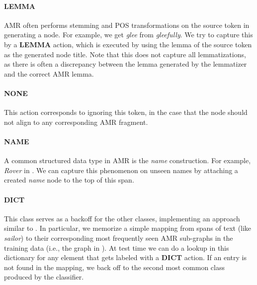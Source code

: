 \documentclass[11pt]{article}
\newcommand\w[1]{\textit{#1}} %
\newcommand\n[1]{\textit{#1}} %
\begin{document}
\paragraph{LEMMA} AMR often performs stemming and POS transformations on the source token in generating a node. 
For example, we get \n{glee} from \w{gleefully}.
We try to capture this by a \textbf{LEMMA} action, which is executed by using the lemma of the source token as the generated node title.
Note that this does not capture all lemmatizations, as there is often a discrepancy
  between the lemma generated by the lemmatizer and the correct AMR lemma.

\paragraph{NONE} This action corresponds to ignoring this token, in the case that
  the node should not align to any corresponding AMR fragment.

\paragraph{NAME} A common structured data type in AMR is the \n{name} construction. 
For example, \w{Rover} in .
We can capture this phenomenon on unseen names by attaching a created \n{name} node to the top of this span.

\paragraph{DICT} This class serves as a backoff for the other classes, implementing
an approach similar to .
In particular, we memorize a simple mapping from spans of text
  (like \w{sailor}) to their corresponding most frequently seen AMR sub-graphs 
  in the training data (i.e., the graph in ).
At test time we can do a lookup in this dictionary for any element that gets 
  labeled with a \textbf{DICT} action. 
If an entry is not found in the mapping, we back off to the second most common
  class produced by the classifier.
\end{document}

